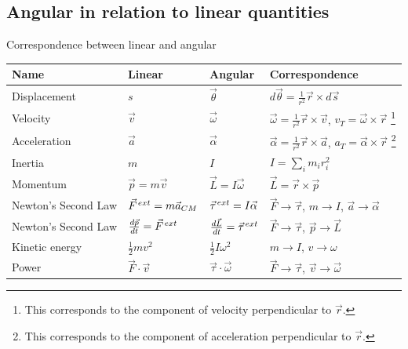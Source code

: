 \documentclass[aspectratio=169,
hyperref={colorlinks,urlcolor=blue}
]{beamer}
\begin{document}
\subsection{Angular in relation to linear quantities}
\label{subsec:correspondencetable}
\begin{frame}{Correspondence between linear and angular}
\begin{tabular}{llll}
\textbf{Name} &\textbf{Linear} & \textbf{Angular} & \textbf{Correspondence}\\
\hline\hline
Displacement & $s$ & $\vec \theta$ & $d\vec\theta=\frac{1}{r^2} \vec r\times d\vec s$  \\
Velocity & $\vec v$ & $\vec \omega$ & $\vec\omega=\frac{1}{r^2} \vec r\times \vec v$, $v_T = \vec\omega\times \vec r$ \footnote{This corresponds to the component of velocity perpendicular to $\vec r$.}\\
Acceleration & $\vec a$ & $\vec \alpha$ & $\vec\alpha=\frac{1}{r^2} \vec r\times \vec a$, $a_T = \vec\alpha\times \vec r$ \footnote{This corresponds to the component of acceleration perpendicular to $\vec r$.}\\
Inertia& $m$ & $I$ & $I=\sum_i m_ir_i^2$ \\
Momentum& $\vec p=m\vec v$& $\vec L = I\vec \omega$ &$\vec L = \vec r\times \vec p$ \\
Newton's Second Law&$\pvec F^{ext}=m\vec a_{CM}$ & $\pvec \tau^{ext} = I\vec\alpha$& $\vec F \to \vec\tau$, $m\to I$, $\vec a \to \vec \alpha$\\
Newton's Second Law& $\frac{d\vec p}{dt} =\pvec F^{ext}$ & $\frac{d\vec L}{dt} =\pvec \tau^{ext}$&$\vec F \to \vec\tau$, $\vec p \to \vec L$ \\
Kinetic energy&$\frac{1}{2}mv^2$ &$\frac{1}{2}I\omega^2$ &$m\to I$, $v\to \omega$ \\
Power&$\vec F \cdot \vec v$ &$\vec \tau \cdot \vec\omega$ &$\vec F \to \vec\tau$, $\vec v\to \vec\omega$  \\
\end{tabular}
\end{frame}




\end{document}
